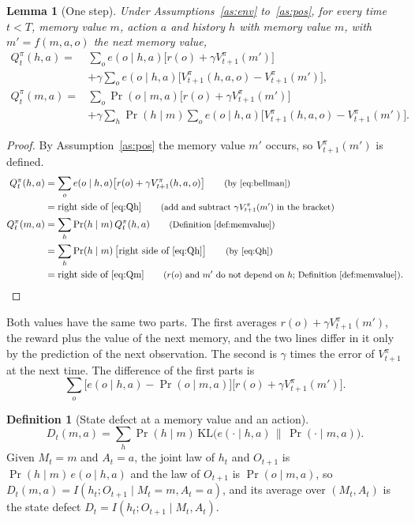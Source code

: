 \documentclass{article}
\newtheorem{lemma}[proposition]{Lemma}
\theoremstyle{definition}
\newtheorem{definition}[proposition]{Definition}
\numberwithin{equation}{section}
\newcommand{\KL}{\mathrm{KL}}
\newcommand{\why}[1]{\tag*{\small(#1)}}
\begin{document}
\begin{lemma}[One step]\label{lem:onestep}
Under Assumptions~\ref{as:env} to~\ref{as:pos}, for every time $t<T$, memory value $m$, action $a$ and history $h$ with memory value $m$, with $m'=f(m,a,o)$ the next memory value,
\begin{align}
Q^\pi_t(h,a)={}&\sum_oe(o\mid h,a)\big[r(o)+\gamma V^\pi_{t+1}(m')\big] \nonumber\\
&+\gamma\sum_oe(o\mid h,a)\big[V^\pi_{t+1}(h,a,o)-V^\pi_{t+1}(m')\big], \label{eq:Qh}\\
Q^\pi_t(m,a)={}&\sum_o\Pr(o\mid m,a)\big[r(o)+\gamma V^\pi_{t+1}(m')\big] \nonumber\\
&+\gamma\sum_h\Pr(h\mid m)\sum_oe(o\mid h,a)\big[V^\pi_{t+1}(h,a,o)-V^\pi_{t+1}(m')\big]. \label{eq:Qm}
\end{align}
\end{lemma}

\begin{proof}
By Assumption~\ref{as:pos} the memory value $m'$ occurs, so $V^\pi_{t+1}(m')$ is defined.
\begin{align*}
Q^\pi_t(h,a)&=\sum_oe(o\mid h,a)\big[r(o)+\gamma V^\pi_{t+1}(h,a,o)\big] \why{by \eqref{eq:bellman}}\\
&=\text{right side of \eqref{eq:Qh}} \why{add and subtract $\gamma V^\pi_{t+1}(m')$ in the bracket}\\
Q^\pi_t(m,a)&=\sum_h\Pr(h\mid m)\,Q^\pi_t(h,a) \why{Definition~\ref{def:memvalue}}\\
&=\sum_h\Pr(h\mid m)\,\big[\text{right side of \eqref{eq:Qh}}\big] \why{by \eqref{eq:Qh}}\\
&=\text{right side of \eqref{eq:Qm}} \why{$r(o)$ and $m'$ do not depend on $h$; Definition~\ref{def:memvalue}}.
\end{align*}
\end{proof}

Both values have the same two parts. The first averages $r(o)+\gamma V^\pi_{t+1}(m')$, the reward plus the value of the next memory, and the two lines differ in it only by the prediction of the next observation. The second is $\gamma$ times the error of $V^\pi_{t+1}$ at the next time. The difference of the first parts is
\begin{equation}\label{eq:now}
\sum_o\big[e(o\mid h,a)-\Pr(o\mid m,a)\big]\big[r(o)+\gamma V^\pi_{t+1}(m')\big].
\end{equation}

\begin{definition}[State defect at a memory value and an action]\label{def:D}
\[
D_t(m,a)=\sum_h\Pr(h\mid m)\,\KL\big(e(\cdot\mid h,a)\,\big\|\,\Pr(\cdot\mid m,a)\big).
\]
Given $M_t=m$ and $A_t=a$, the joint law of $h_t$ and $O_{t+1}$ is $\Pr(h\mid m)\,e(o\mid h,a)$ and the law of $O_{t+1}$ is $\Pr(o\mid m,a)$, so $D_t(m,a)=I(h_t;O_{t+1}\mid M_t=m,A_t=a)$, and its average over $(M_t,A_t)$ is the state defect $D_t=I(h_t;O_{t+1}\mid M_t,A_t)$.
\end{definition}
\end{document}
